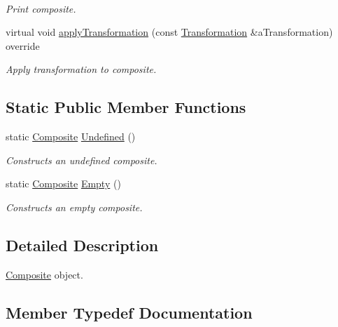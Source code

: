 \begin{DoxyCompactItemize}
$$\begin{DoxyCompactList}\small\item\em Print composite. \end{DoxyCompactList}\item 
virtual void \hyperlink{classostk_1_1math_1_1geom_1_1d2_1_1objects_1_1_composite_ad7c787dc3c919a060e075902c0909413}{apply\+Transformation} (const \hyperlink{classostk_1_1math_1_1geom_1_1d2_1_1_transformation}{Transformation} \&a\+Transformation) override
\begin{DoxyCompactList}\small\item\em Apply transformation to composite. \end{DoxyCompactList}\end{DoxyCompactItemize}
\subsection*{Static Public Member Functions}
\begin{DoxyCompactItemize}
\item 
static \hyperlink{classostk_1_1math_1_1geom_1_1d2_1_1objects_1_1_composite}{Composite} \hyperlink{classostk_1_1math_1_1geom_1_1d2_1_1objects_1_1_composite_a31e5c8fa1371b3b497ac7102613b2c25}{Undefined} ()
\begin{DoxyCompactList}\small\item\em Constructs an undefined composite. \end{DoxyCompactList}\item 
static \hyperlink{classostk_1_1math_1_1geom_1_1d2_1_1objects_1_1_composite}{Composite} \hyperlink{classostk_1_1math_1_1geom_1_1d2_1_1objects_1_1_composite_a2122fe1958355b07717a376d7778044f}{Empty} ()
\begin{DoxyCompactList}\small\item\em Constructs an empty composite. \end{DoxyCompactList}\end{DoxyCompactItemize}


\subsection{Detailed Description}
\hyperlink{classostk_1_1math_1_1geom_1_1d2_1_1objects_1_1_composite}{Composite} object. 

\subsection{Member Typedef Documentation}
\mbox{\label{classostk_1_1math_1_1geom_1_1d2_1_1objects_1_1_composite_a848b806da9977737e1b100c1b51b39d9}} 
